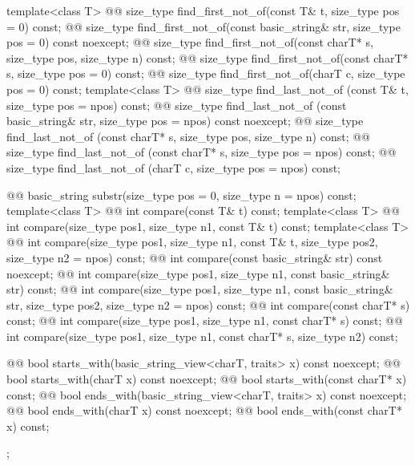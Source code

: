 \documentclass{wg21}
\begin{document}
\begin{codeblock}
{{    template<class T>
      @@ size_type find_first_not_of(const T& t, size_type pos = 0) const;
    @@ size_type find_first_not_of(const basic_string& str, size_type pos = 0) const noexcept;
    @@ size_type find_first_not_of(const charT* s, size_type pos, size_type n) const;
    @@ size_type find_first_not_of(const charT* s, size_type pos = 0) const;
    @@ size_type find_first_not_of(charT c, size_type pos = 0) const;
    template<class T>
      @@ size_type find_last_not_of (const T& t, size_type pos = npos) const;
    @@ size_type find_last_not_of (const basic_string& str, size_type pos = npos) const noexcept;
    @@ size_type find_last_not_of (const charT* s, size_type pos, size_type n) const;
    @@ size_type find_last_not_of (const charT* s, size_type pos = npos) const;
    @@ size_type find_last_not_of (charT c, size_type pos = npos) const;

    @@ basic_string substr(size_type pos = 0, size_type n = npos) const;
    template<class T>
      @@ int compare(const T& t) const;
    template<class T>
      @@ int compare(size_type pos1, size_type n1, const T& t) const;
    template<class T>
      @@ int compare(size_type pos1, size_type n1, const T& t,
                                      size_type pos2, size_type n2 = npos) const;
    @@ int compare(const basic_string& str) const noexcept;
    @@ int compare(size_type pos1, size_type n1, const basic_string& str) const;
    @@ int compare(size_type pos1, size_type n1, const basic_string& str,
                                    size_type pos2, size_type n2 = npos) const;
    @@ int compare(const charT* s) const;
    @@ int compare(size_type pos1, size_type n1, const charT* s) const;
    @@ int compare(size_type pos1, size_type n1, const charT* s, size_type n2) const;

    @@ bool starts_with(basic_string_view<charT, traits> x) const noexcept;
    @@ bool starts_with(charT x) const noexcept;
    @@ bool starts_with(const charT* x) const;
    @@ bool ends_with(basic_string_view<charT, traits> x) const noexcept;
    @@ bool ends_with(charT x) const noexcept;
    @@ bool ends_with(const charT* x) const;
  };

}
\end{codeblock}
\end{document}
